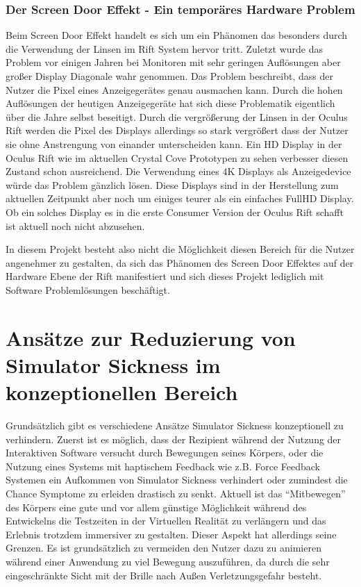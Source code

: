 \documentclass[pagesize, paper=a4, fontsize=12pt,titlepage=true, headings=small, headnosepline, abstractoff, liststotoc, nochapterprefix, plainheadsepline]{scrreprt}
\begin{document}
\subsubsection{Der Screen Door Effekt - Ein temporäres Hardware Problem}
Beim Screen Door Effekt handelt es sich um ein Phänomen das besonders durch die Verwendung der Linsen im Rift System hervor tritt. Zuletzt wurde das Problem vor einigen Jahren bei Monitoren mit sehr geringen Auflösungen aber großer Display Diagonale wahr genommen. Das Problem beschreibt, dass der Nutzer die Pixel eines Anzeigegerätes genau ausmachen kann. Durch die hohen Auflösungen der heutigen Anzeigegeräte hat sich diese Problematik eigentlich über die Jahre selbst beseitigt. Durch die vergrößerung der Linsen in der Oculus Rift werden die Pixel des Displays allerdings so stark vergrößert dass der Nutzer sie ohne Anstrengung von einander unterscheiden kann. Ein HD Display in der Oculus Rift wie im aktuellen Crystal Cove Prototypen zu sehen verbesser diesen Zustand schon ausreichend. Die Verwendung eines 4K Displays als Anzeigedevice würde das Problem gänzlich lösen. Diese Displays sind in der Herstellung zum aktuellen Zeitpunkt aber noch um einiges teurer als ein einfaches FullHD Display. Ob ein solches Display es in die erste Consumer Version der Oculus Rift schafft ist aktuell noch nicht abzusehen. 

In diesem Projekt besteht also nicht die Möglichkeit diesen Bereich für die Nutzer angenehmer zu gestalten, da sich das Phänomen des Screen Door Effektes auf der Hardware Ebene der Rift manifestiert und sich dieses Projekt lediglich mit Software Problemlösungen beschäftigt.

\section{Ansätze zur Reduzierung von Simulator Sickness im konzeptionellen Bereich}
Grundsätzlich gibt es verschiedene Ansätze Simulator Sickness konzeptionell zu verhindern. Zuerst ist es möglich, dass der Rezipient während der Nutzung der Interaktiven Software versucht durch Bewegungen seines Körpers, oder die Nutzung eines Systems mit haptischem Feedback wie z.B. Force Feedback Systemen ein Aufkommen von Simulator Sickness verhindert oder zumindest die Chance Symptome zu erleiden drastisch zu senkt. Aktuell ist das "`Mitbewegen"' des Körpers eine gute und vor allem günstige Möglichkeit während des Entwickelns die Testzeiten in der Virtuellen Realität zu verlängern und das Erlebnis trotzdem immersiver zu gestalten. Dieser Aspekt hat allerdings seine Grenzen. Es ist grundsätzlich zu vermeiden den Nutzer dazu zu animieren während einer Anwendung zu viel Bewegung auszuführen, da durch die sehr eingeschränkte Sicht mit der Brille nach Außen Verletzungsgefahr besteht.
\end{document}
